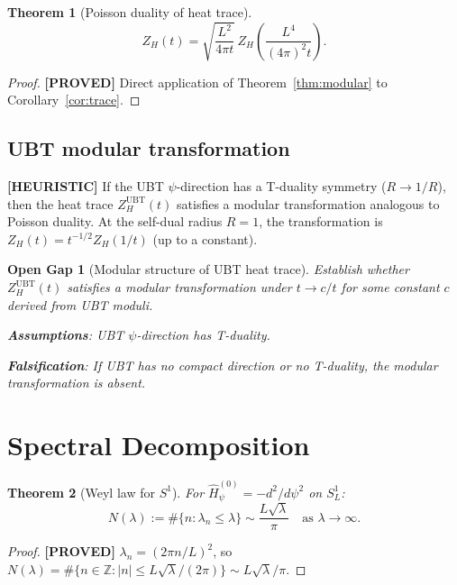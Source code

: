 \documentclass[11pt,a4paper]{article}
\newtheorem{theorem}{Theorem}
\newtheorem{gap}{Open Gap}
\newcommand{\proved}[1]{\textbf{[PROVED]} #1}
\newcommand{\heuristic}[1]{\textbf{[HEURISTIC]} #1}
\begin{document}
\begin{theorem}[Poisson duality of heat trace]
  \[
    Z_H(t) = \sqrt{\frac{L^2}{4\pi t}}\, Z_H\!\left(\frac{L^4}{(4\pi)^2 t}\right).
  \]
\end{theorem}

\begin{proof}
  \proved{} Direct application of Theorem~\ref{thm:modular} to Corollary~\ref{cor:trace}.
\end{proof}

\subsection{UBT modular transformation}

\heuristic{If the UBT $\psi$-direction has a T-duality symmetry ($R \to 1/R$),
then the heat trace $Z_H^\mathrm{UBT}(t)$ satisfies a modular transformation
analogous to Poisson duality.  At the self-dual radius $R = 1$, the
transformation is $Z_H(t) = t^{-1/2} Z_H(1/t)$ (up to a constant).}

\begin{gap}[Modular structure of UBT heat trace]
  \label{gap:modular}
  Establish whether $Z_H^\mathrm{UBT}(t)$ satisfies a modular transformation
  under $t \to c/t$ for some constant $c$ derived from UBT moduli.

  \textbf{Assumptions}: UBT $\psi$-direction has T-duality.

  \textbf{Falsification}: If UBT has no compact direction or no T-duality,
  the modular transformation is absent.
\end{gap}

\section{Spectral Decomposition}

\begin{theorem}[Weyl law for $S^1$]
  For $\hat{H}_\psi^{(0)} = -d^2/d\psi^2$ on $S^1_L$:
  \[
    N(\lambda) := \#\{n : \lambda_n \leq \lambda\}
    \sim \frac{L\sqrt{\lambda}}{\pi} \quad \text{as } \lambda \to \infty.
  \]
\end{theorem}

\begin{proof}
  \proved{} $\lambda_n = (2\pi n/L)^2$, so $N(\lambda) = \#\{n \in \mathbb{Z} : |n| \leq L\sqrt{\lambda}/(2\pi)\} \sim L\sqrt{\lambda}/\pi$.
\end{proof}
\end{document}
